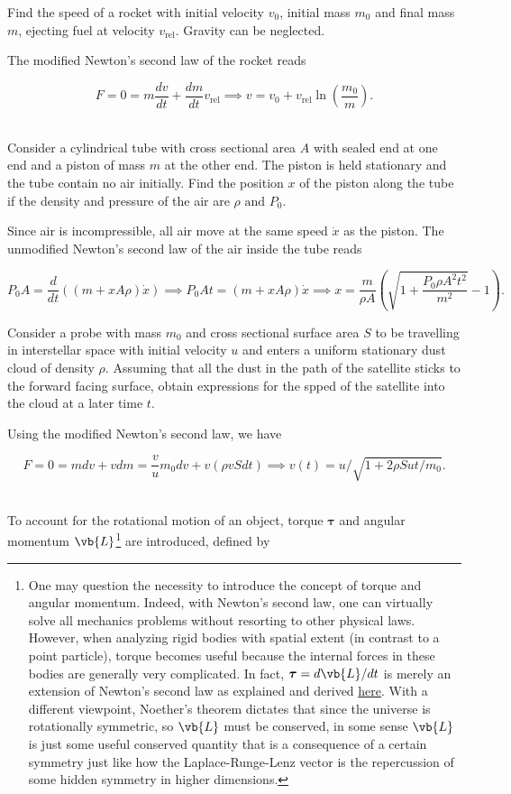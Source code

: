 \documentclass[a4paper,12pt]{report}
\begin{document}
{Find the speed of a rocket with initial velocity \(v_0 \), initial mass \(m_0 \) and final mass \(m \), ejecting fuel at velocity \(v_{\text{rel} } \). Gravity can be neglected. }
{The modified Newton's second law of the rocket reads

\begin{equation}
	F = 0 = m\frac{dv}{dt} + \frac{dm}{dt}v_{\text{rel} } \implies v = v_0 + v_{\text{rel} }  \ln \left( \frac{m_0 }{m }  \right).
\end{equation}~
} 

{Consider a cylindrical tube with cross sectional area \(A\) with sealed end at one end and a piston of mass \(m\) at the other end. The piston is held stationary and the tube contain no air initially. Find the position \(x\) of the piston along the tube if the density and pressure of the air are \(\rho \text { and } P_0 \).}
{Since air is incompressible, all air move at the same speed \(\dot{x} \) as the piston. The unmodified Newton's second law of the air inside the tube reads

\begin{equation}
	P_0 A = \frac{d}{dt}((m+xA\rho )\dot{x} ) \implies P_0 At = (m+xA\rho )\dot{x} \implies x = \frac{m}{\rho A}\left( \sqrt{1+\frac{P_0 \rho A^2t^2}{m^2} } -1 \right).  
\end{equation}
} 

{Consider a probe with mass \(m_0 \) and cross sectional surface area \(S\)  to be travelling in interstellar space with initial velocity \(u\) and enters a uniform stationary dust cloud of density \(\rho \). Assuming that all the dust in the path of the satellite sticks to the forward facing surface, obtain expressions for the spped of the satellite into the cloud at a later time \(t\). }
{Using the modified Newton's second law, we have

\begin{equation}
	F = 0 = mdv + vdm = \frac{v}{u} m_0 dv + v (\rho vSdt) \implies v(t) = u/\sqrt{1+2\rho Sut /m_0 }.
\end{equation}
~
} 


To account for the rotational motion of an object, torque \(\boldsymbol{\tau } \) and angular momentum \(\vb{L} \)\footnote{One may question the necessity to introduce the concept of torque and angular momentum. Indeed, with Newton's second law, one can virtually solve all mechanics problems without resorting to other physical laws. However, when analyzing rigid bodies with spatial extent (in contrast to a point particle), torque becomes useful because the internal forces in these bodies are generally very complicated. In fact, \(\boldsymbol{\tau } = d \vb{L} /dt \) is merely an extension of Newton's second law as explained and derived \href{https://knzhou.github.io/handouts/M2Sol.pdf}{here}. With a different viewpoint, Noether's theorem dictates that since the universe is rotationally symmetric, so \(\vb{L} \) must be conserved, in some sense \(\vb{L}\) is just some useful conserved quantity that is a consequence of a certain symmetry just like how the Laplace-Runge-Lenz vector is the repercussion of some hidden symmetry in higher dimensions.} are introduced, defined by
\end{document}

